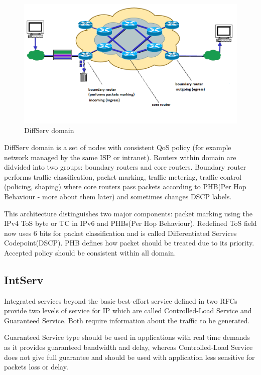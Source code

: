 \documentclass[11pt]{book}
\begin{document}
			\begin{figure}[H]
				\begin{center}
					\includegraphics[width=.7\textwidth]{img/qos/diffserv.png}
				\end{center}
				\caption{DiffServ domain}
			\end{figure} %
			
      DiffServ domain is a set of nodes with consistent QoS policy (for example network managed by the same ISP or
      intranet). Routers within domain are didvided into two groups: boundary routers and core routers. Boundary router
      performs traffic classification, packet marking, traffic metering, traffic control (policing, shaping) where core
      routers pass packets according to PHB(Per Hop Behaviour - more about them later) and sometimes changes DSCP
      labels.			
			
			This architecture distinguishes two major components: packet marking using the IPv4 ToS byte or TC in
			IPv6 and PHBs(Per Hop Behaviour).
			\medskip
			Redefined ToS field now uses 6 bits for packet classification and is called Differentiated Services 
			Codepoint(DSCP). 
			PHB defines how packet should be treated due to its priority. Accepted policy should be consistent
			within all domain.
			
		\subsection{IntServ}
			
			Integrated services beyond the basic best-effort service defined in two RFCs provide two levels of 
			service for IP which are called Controlled-Load Service and Guaranteed Service. Both 
			require information about the traffic to be generated. 
			
			Guaranteed Service type should be used in applications with real time demands as it provides
			guaranteed bandwidth and delay, whereas Controlled-Load Service does not give full guarantee
			and should be used with application less sensitive for packets loss or delay.
			
\end{document}
